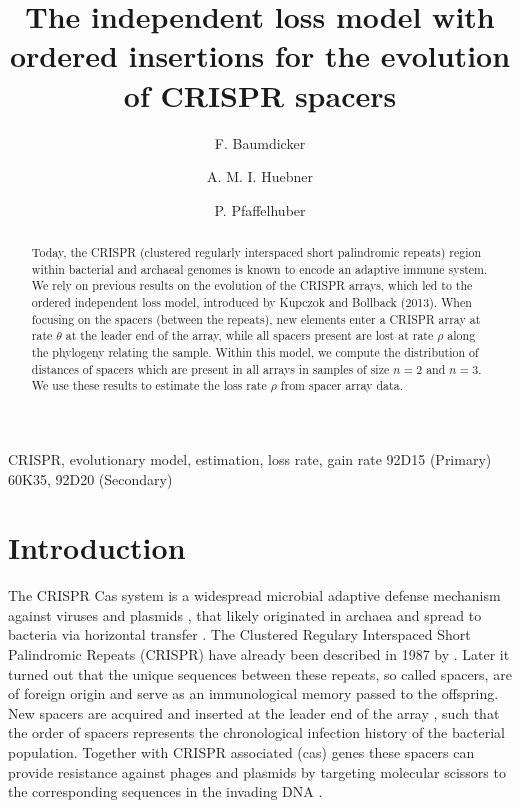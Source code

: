 \documentclass[preprint,authoryear]{elsarticle}
\theoremstyle{definition}
\numberwithin{equation}{section}
\numberwithin{figure}{section}
\begin{document}
\begin{frontmatter}

\title{The independent loss model with ordered insertions for the evolution of
  CRISPR spacers}

\author[mymainaddress]{F. Baumdicker}
\author[mymainaddress]{A. M. I. Huebner}
\author[mymainaddress]{P. Pfaffelhuber}

\address[mymainaddress]{Department of Mathematical Stochastics,
  Albert-Ludwigs-University of Freiburg}

\begin{abstract}
  Today, the CRISPR (clustered regularly interspaced short palindromic
  repeats) region within bacterial and archaeal genomes is known to
  encode an adaptive immune system. We rely on previous results on the
  evolution of the CRISPR arrays, which led to the ordered independent
  loss model, introduced by Kupczok and Bollback (2013). When focusing
  on the spacers (between the repeats), new elements enter a
  CRISPR array at rate $\theta$ at the leader end of the array,
  while all spacers present are lost at rate $\rho$ along the
  phylogeny relating the sample. Within this model, we compute the
  distribution of distances of spacers which are present in all arrays
  in samples of size $n=2$ and $n=3$. We use these results to
  estimate the loss rate $\rho$ from spacer array data.
\end{abstract}

\begin{keyword}
CRISPR, evolutionary model, estimation, loss rate, gain rate
\MSC[2010] 92D15 (Primary) 60K35, 92D20 (Secondary)
\end{keyword}

\end{frontmatter}


\section{Introduction}

The CRISPR Cas system is a widespread microbial adaptive defense
mechanism against viruses and plasmids
\citep{Marraffini2015,Rath2015}, that likely originated in archaea and
spread to bacteria via horizontal transfer \citep{Makarova2011origin}.
The Clustered Regulary Interspaced Short Palindromic Repeats (CRISPR)
have already been described in 1987 by \cite{Ishino1987}.  Later it
turned out that the unique sequences between these repeats, so called
spacers, are of foreign origin \citep{Bolotin2005} and serve as an
immunological memory passed to the offspring.  New spacers are
acquired and inserted at the leader end of the array
\citep{Barrangou2007}, such that the order of spacers represents the
chronological infection history of the bacterial population. Together
with CRISPR associated (cas) genes these spacers can provide
resistance against phages and plasmids by targeting molecular scissors
to the corresponding sequences in the invading DNA
\citep{Barrangou2007}.
 
\end{document}
